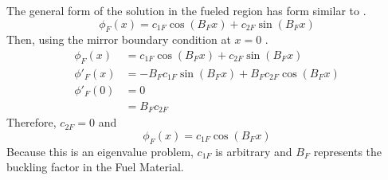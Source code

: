   The general form of the solution in the fueled region has form similar to 
  .
  \begin{equation}
    \phi_F(x) = c_{1F} \cos(B_F x) + c_{2F} \sin(B_F x)
  \end{equation}
  Then, using the mirror boundary condition at $x=0$ .
  \begin{align}
    \phi_F(x) &= c_{1F} \cos(B_F x) + c_{2F} \sin(B_F x) \\
    \phi'_F(x) &= -B_F c_{1F} \sin(B_F x) + B_F c_{2F} \cos(B_F x) \\
    \phi'_F(0) &= 0\\
    &=B_F c_{2F}
  \end{align}
  Therefore, $c_{2F}=0$ and
  \begin{equation}
    \phi_F(x) = c_{1F} \cos(B_F x)
  \end{equation}
  Because this is an eigenvalue problem, $c_{1F}$ is arbitrary and $B_F$ 
  represents the buckling factor in the Fuel Material.
  
